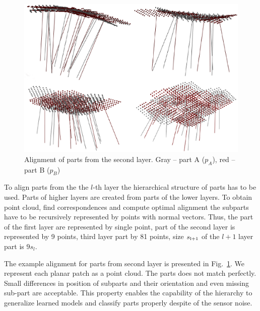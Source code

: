 \documentclass[letterpaper,10pt,conference]{ieeeconf}  %
\begin{document}
\begin{figure}[t]
 \centering
 \includegraphics[width=0.95\columnwidth]{images/parts2ndLayer.eps}
 \caption{Alignment of parts from the second layer. Gray -- part A ($p_A$), red -- part B ($p_B$)}
 \label{parts2ndLayer}
\end{figure}

To align parts from the the $l$-th layer the hierarchical structure of parts has to be used. Parts of higher layers are created from parts of the lower layers. To obtain point cloud, find correspondences and compute optimal alignment the subparts have to be recursively represented by points with normal vectors. Thus, the part of the first layer are represented by single point, part of the second layer is represented by 9 points, third layer part by 81 points, size $s_{\rm l+1}$ of the $l+1$ layer part is $9s_l$. 

The example alignment for parts from second layer is presented in Fig.~\ref{parts2ndLayer}. We represent each planar patch as a point cloud. The parts does not match perfectly. Small differences in position of subparts and their orientation and even missing sub-part are acceptable. This property enables the capability of the hierarchy to generalize learned models and classify parts properly despite of the sensor noise. 
\end{document}

